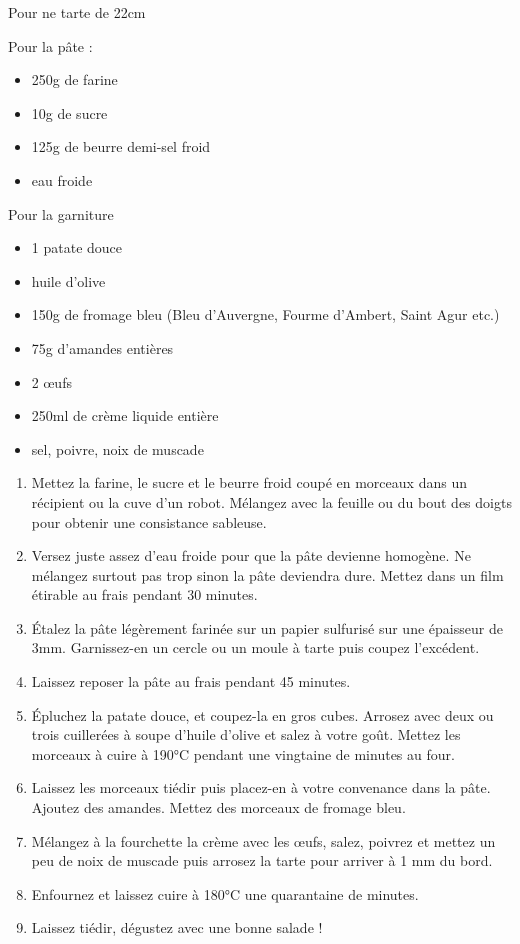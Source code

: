 \bigskip
{}
{Pour ne tarte de 22cm}{Pour la pâte :
\begin{itemize}
	\item 250g de farine
	\item 10g de sucre
	\item 125g de beurre demi-sel froid
	\item eau froide
\end{itemize}
Pour la garniture
\begin{itemize}
	\item 1 patate douce
	\item huile d'olive
	\item 150g de fromage bleu (Bleu d'Auvergne, Fourme d'Ambert, Saint Agur etc.)
	\item 75g d'amandes entières
	\item 2 œufs
	\item 250ml de crème liquide entière
	\item sel, poivre, noix de muscade
\end{itemize}}
{\begin{enumerate}
	\item Mettez la farine, le sucre et le beurre froid coupé en morceaux dans un récipient ou la cuve d'un robot. Mélangez avec la feuille ou du bout des doigts pour obtenir une consistance sableuse.
	\item Versez juste assez d'eau froide pour que la pâte devienne homogène. Ne mélangez surtout pas trop sinon la pâte deviendra dure. Mettez dans un film étirable au frais pendant 30 minutes. 
	\item Étalez la pâte légèrement farinée sur un papier sulfurisé sur une épaisseur de 3mm. Garnissez-en un cercle ou un moule à tarte puis coupez l'excédent.
	\item Laissez reposer la pâte au frais pendant 45 minutes.
	\item Épluchez la patate douce, et coupez-la en gros cubes. Arrosez avec deux ou trois cuillerées à soupe d'huile d'olive et salez à votre goût. Mettez les morceaux à cuire à 190°C pendant une vingtaine de minutes au four.
	\item Laissez les morceaux tiédir puis placez-en à votre convenance dans la pâte. Ajoutez des amandes. Mettez des morceaux de fromage bleu.
	\item Mélangez à la fourchette la crème avec les œufs, salez, poivrez et mettez un peu de noix de muscade puis arrosez la tarte pour arriver à 1 mm du bord.
	\item Enfournez et laissez cuire à 180°C une quarantaine de minutes.
	\item Laissez tiédir, dégustez avec une bonne salade ! 
\end{enumerate}}


